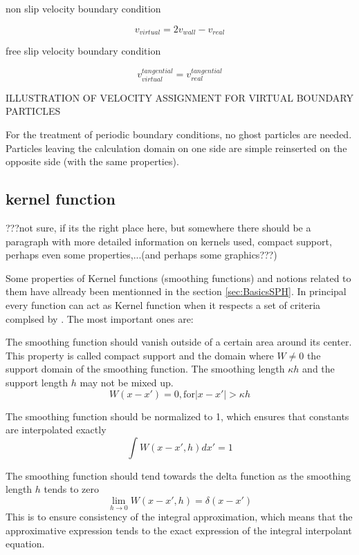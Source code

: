 \documentclass{report}
\begin{document}
non slip velocity boundary condition

\begin{equation}
v_{virtual}=2v_{wall}-v_{real}
\end{equation}

free slip velocity boundary condition

\begin{equation}
v_{virtual}^{tangential}=v_{real}^{tangential}
\end{equation}

ILLUSTRATION OF VELOCITY ASSIGNMENT FOR VIRTUAL BOUNDARY PARTICLES

For the treatment of periodic boundary conditions, no ghost particles are
needed. Particles leaving the calculation domain on one side are simple
reinserted on the opposite side (with the same properties).


\subsection{kernel function}
???not sure, if its the right place here, but somewhere there should be a
paragraph with more detailed information on kernels used, compact support,
perhaps even some properties,...(and perhaps some graphics???)


Some properties of Kernel functions (smoothing functions) and notions related
to them have allready been mentionned in the section
\ref{sec:BasicsSPH}. In principal every function can act as Kernel function
when it respects a set of criteria complsed by \cite{Liu2003}.
The most important ones are:

The smoothing function should vanish outside of a certain area around its
center. This property is called compact support and the domain where $W\neq0$
the support domain of the smoothing function. The smoothing length $\kappa h$ and the
support length $h$ may not be mixed up.
\begin{equation}
W(x-x')=0,\text{for}|x-x'|>\kappa h
\end{equation}

The smoothing function should be normalized to 1, which ensures that constants
are interpolated exactly
\begin{equation}
\int{W(x-x',h)dx'}=1
\end{equation}

The smoothing function should tend towards the delta function as the smoothing
length $h$ tends to zero
\begin{equation}
\lim\limits_{h \rightarrow 0}{W(x-x',h)}=\delta(x-x')
\end{equation}
This is to ensure consistency of the integral approximation, which means that
the approximative expression tends to the exact expression of the integral
interpolant equation.
\end{document}
